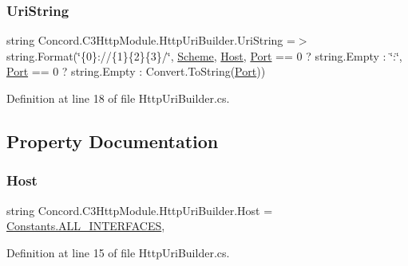\subsubsection{\texorpdfstring{UriString}{UriString}}
{\footnotesize\ttfamily string Concord.\+C3\+Http\+Module.\+Http\+Uri\+Builder.\+Uri\+String =$>$ string.\+Format(\char`\"{}\{0\}\+://\{1\}\{2\}\{3\}/\char`\"{}, \mbox{\hyperlink{class_concord_1_1_c3_http_module_1_1_http_uri_builder_aec68ef1c873d7894850552ee9067119a}{Scheme}}, \mbox{\hyperlink{class_concord_1_1_c3_http_module_1_1_http_uri_builder_aea098c21d58cb7c0f34dba606cee80fd}{Host}}, \mbox{\hyperlink{class_concord_1_1_c3_http_module_1_1_http_uri_builder_adc628b6895d402e3f805cabafce8cb11}{Port}} == 0 ? string.\+Empty \+: \char`\"{}\+:\char`\"{}, \mbox{\hyperlink{class_concord_1_1_c3_http_module_1_1_http_uri_builder_adc628b6895d402e3f805cabafce8cb11}{Port}} == 0 ? string.\+Empty \+: Convert.\+To\+String(\mbox{\hyperlink{class_concord_1_1_c3_http_module_1_1_http_uri_builder_adc628b6895d402e3f805cabafce8cb11}{Port}}))}



Definition at line 18 of file Http\+Uri\+Builder.\+cs.



\subsection{Property Documentation}
\mbox{\label{class_concord_1_1_c3_http_module_1_1_http_uri_builder_aea098c21d58cb7c0f34dba606cee80fd}} 
\subsubsection{\texorpdfstring{Host}{Host}}
{\footnotesize\ttfamily string Concord.\+C3\+Http\+Module.\+Http\+Uri\+Builder.\+Host = \mbox{\hyperlink{class_concord_1_1_c3_http_module_1_1_constants_a3fe72e8bc32c96064538c8af8199c478}{Constants.\+A\+L\+L\+\_\+\+I\+N\+T\+E\+R\+F\+A\+C\+ES}}\hspace{0.3cm}{\ttfamily [get]}, {\ttfamily [set]}}



Definition at line 15 of file Http\+Uri\+Builder.\+cs.

\mbox{\label{class_concord_1_1_c3_http_module_1_1_http_uri_builder_adc628b6895d402e3f805cabafce8cb11}} 
